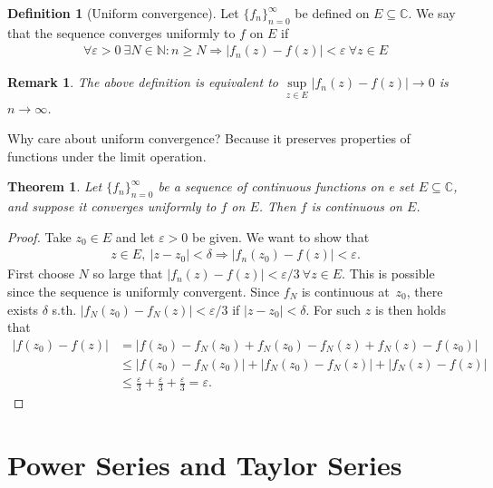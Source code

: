 \documentclass[12pt, a4paper]{article}
\theoremstyle{plain}
\newtheorem{thm}{Theorem} %
\newtheorem{rem}{Remark}
\theoremstyle{definition}
\newtheorem{definition}{Definition} %
\begin{document}
			\begin{definition}[Uniform convergence]
				Let $\{f_n\}_{n=0}^{\infty}$ be defined on $E\subseteq \mathbb{C}$. We say that the sequence converges uniformly to $f$ on $E$ if 
				\begin{align*}
					\forall \varepsilon>0\:\exists N\in \mathbb{N}: n\ge N\Rightarrow |f_n(z)-f(z)|<\varepsilon\:\forall z\in E
				\end{align*}
			\end{definition}

			\begin{rem}
				The above definition is equivalent to $\sup\limits_{z\in E}|f_n(z)-f(z)|\to 0$ is $n\to\infty$.
			\end{rem}

			Why care about uniform convergence? Because it preserves properties of functions under the limit operation.

			\begin{thm}
				Let $\{f_n\}_{n=0}^{\infty}$ be a sequence of continuous functions on e set $E\subseteq \mathbb{C}$, and suppose it converges uniformly to $f$ on $E$. Then $f$ is continuous on $E$.
			\end{thm}

			\begin{proof}
				Take $z_0\in E$ and let $\varepsilon>0$ be given. We want to show that
				\begin{align*}
					z\in E,\:|z-z_0|< \delta\Rightarrow |f_n(z_0)-f(z)|<\varepsilon.
				\end{align*}
				First choose $N$ so large that $|f_n(z)-f(z)|<\varepsilon/3\:\forall z\in E$. This is possible since the sequence is uniformly convergent. Since $f_N$ is continuous at $z_0$, there exists $\delta$ s.th. $|f_N(z_0)-f_N(z)|<\varepsilon/3$ if $|z-z_0|<\delta$. For such $z$ is then holds that
				\begin{align*}
					|f(z_0)-f(z)| &= |f(z_0)-f_N(z_0)+f_N(z_0)-f_N(z)+f_N(z)-f(z_0)|\\ &\le
					|f(z_0)-f_N(z_0)| + |f_N(z_0)-f_N(z)| + |f_N(z)-f(z)|\\ &\le
					\frac{\varepsilon}{3}+\frac{\varepsilon}{3}+\frac{\varepsilon}{3} = \varepsilon.
				\end{align*}
			\end{proof}
	\section{Power Series and Taylor Series} %
	\label{sec:power_series_and_taylor_series}
	
\end{document}
